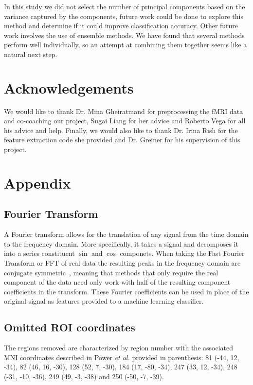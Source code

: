 \documentclass{article} %
\begin{document}
In this study we did not select the number of principal components based 
on the variance captured by the components, future work could be done
to explore this method and determine if it could improve classification
accuracy. Other future work involves the use of ensemble methods. We have
found that several methods perform well individually, so an attempt at
combining them together seems like a natural next step.

\section{Acknowledgements}
We would like to thank Dr. Mina Gheiratmand for preprocessing the fMRI data 
and co-coaching our project, Sugai Liang for her advice and Roberto Vega for
all his advice and help. Finally, we would also like to thank Dr. Irina Rish
for the feature extraction code she provided and Dr. Greiner for his
supervision of this project.




\section{Appendix}

\subsection{Fourier Transform}
A Fourier transform allows for the translation of any signal from the time
domain to the frequency domain. More specifically, it takes a signal and
decomposes it into a series constituent $\sin$ and $\cos$ componets. When 
taking the Fast Fourier Transform or FFT of real data the resulting peaks in 
the frequency domain are conjugate symmetric~\cite{duhamel1990fast}, meaning 
that methods that only require the real component of the data need only work 
with half of the resulting component coefficients in the transform. These 
Fourier coefficients can be used in place of the original signal as features
provided to a machine learning classifier.

\subsection{Omitted ROI coordinates}
The regions removed
are characterized by region number with the associated MNI coordinates 
described in Power \emph{et al.} provided in parenthesis: 81 (-44, 12, -34), 
82 (46, 16, -30), 128 (52, 7, -30), 184 (17, -80, -34), 247 (33, 12, -34), 
248 (-31, -10, -36), 249 (49, -3, -38) and 250 (-50, -7, -39).
\end{document}
